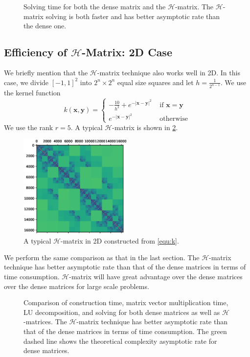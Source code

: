 \documentclass[3p,,preprint,12pt]{elsarticle}
\newcommand{\bx}[0]{\mathbf{x}}
\theoremstyle{definition}
\newcommand{\by}[0]{\mathbf{y}}
\begin{document}
\begin{figure}[htpb]
\centering
\scalebox{0.6}{}
\caption{Solving time for both the dense matrix and the $\mathcal{H}$-matrix. The $\mathcal{H}$-matrix solving is both faster and has better asymptotic rate than the dense one.}
\label{fig:solve}
\end{figure}

\subsection{Efficiency of $\mathcal{H}$-Matrix: 2D Case}

We briefly mention that the $\mathcal{H}$-matrix technique also works well in 2D. In this case, we divide $[-1,1]^2$ into $2^n\times 2^n$ equal size squares and let $h=\frac{1}{2^{n-1}}$. We use the kernel function
\begin{equation}\label{equ:k}
	k(\bx,\by) = \begin{cases}
		-\frac{10}{h^2} + e^{-|\bx-\by|^2} & \mbox{ if } \bx=\by\\
		e^{-|\bx-\by|^2} & \mbox{ otherwise}
	\end{cases}
\end{equation}
We use the rank $r=5$. A typical $\mathcal{H}$-matrix is shown in \cref{fig:2d}.

\begin{figure}[H] %
\centering
\includegraphics[width=0.5\textwidth,keepaspectratio]{figures/2D}
\caption{A typical $\mathcal{H}$-matrix in 2D constructed from \cref{equ:k}.}
\label{fig:2d}
\end{figure}


We perform the same comparison as that in the last section. The $\mathcal{H}$-matrix technique has better asymptotic rate than that of the dense matrices in terms of time consumption. $\mathcal{H}$-matrix will have great advantage over the dense matrices over the dense matrices for large scale problems. 
\begin{figure}[htpb]
\centering
\scalebox{0.6}{}
\caption{Comparison of construction time, matrix vector multiplication time, LU decomposition, and solving for both dense matrices as well as $\mathcal{H}$-matrices. The $\mathcal{H}$-matrix technique has better asymptotic rate than that of the dense matrices in terms of time consumption. The green dashed line shows the theoretical complexity asymptotic rate for dense matrices.}
\label{fig:solve}
\end{figure}
\end{document}
